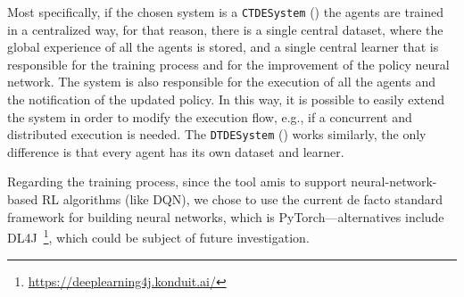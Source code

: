 Most specifically,
 if the chosen system is a \texttt{CTDESystem} () the agents are trained in a centralized way, 
 for that reason, there is  a single central dataset, 
 where the global experience of all the agents is stored, 
 and a single central learner that is responsible for the training process 
 and for the improvement of the policy neural network.
% 
The system is also responsible 
 for the execution of all the agents and the notification of the updated policy. 
 In this way, it is possible to easily extend the system in order to modify the execution flow, e.g., if a concurrent and distributed execution is needed. 
%
The \texttt{DTDESystem} () works similarly, 
 the only difference is that every agent has its own dataset and learner.


Regarding the training process,
 since the tool amis to support neural-network-based RL algorithms (like DQN),
 we chose to use the current de facto standard framework 
 for building neural networks, which is PyTorch---alternatives include DL4J~\footnote{\url{https://deeplearning4j.konduit.ai/}}, which could be subject of future investigation.
 
